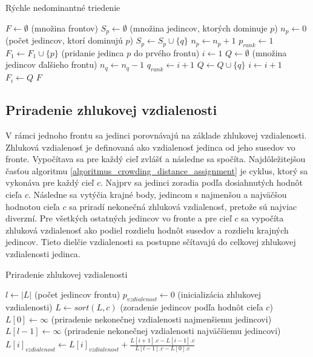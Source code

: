 \vspace*{\dimexpr 0.5\baselineskip\relax}
\begin{algorithm}[h]
\caption{Rýchle nedominantné triedenie}
\label{algoritmus_non_dominated_sorting}
  $F \gets \emptyset$ (množina frontov)\;
   {
    $S_p \gets \emptyset$ (množina jedincov, ktorých dominuje $p$)\;
    $n_p \gets 0$ (počet jedincov, ktorí dominujú $p$)\;
     {
       {
        $S_p \gets S_p \cup \{q\}$\;
      }
       {
        $n_p \gets n_p + 1$\;
      }
    }
     {
      $p_{rank} \gets 1$\;
      $F_1 \gets F_1 \cup \{p\}$ (pridanie jedinca $p$ do prvého frontu)\;
    }
  }
  $i \gets 1$\;
   {
    $Q \gets \emptyset$ (množina jedincov ďalšieho frontu)\;
     {
       {
        $n_q \gets n_q - 1$\;
         {
          $q_{rank} \gets i + 1$\;
          $Q \gets Q \cup \{q\}$\;
        }
      }
    }
    $i \gets i + 1$\;
    $F_i \gets Q$\;
  }
  \Return $F$\;
\end{algorithm}

\subsection*{Priradenie zhlukovej vzdialenosti}
V rámci jednoho frontu sa jedinci porovnávajú na základe zhlukovej vzdialenosti.
Zhluková vzdialenosť je definovaná ako vzdialenosť jedinca od jeho susedov vo fronte.
Vypočítava sa pre každý cieľ zvlášť a následne sa spočíta.
Najdôležitejšou časťou algoritmu \ref{algoritmus_crowding_distance_assignment} je cyklus, ktorý sa vykonáva pre každý cieľ $c$.
Najprv sa jedinci zoradia podľa dosiahnutých hodnôt cieľa $c$.
Následne sa vytýčia krajné body, jedincom s najmenšou a najväčšou hodnotou cieľa $c$ sa priradí nekonečná zhluková vzdialenosť, pretože sú najviac diverzní.
Pre všetkých ostatných jedincov vo fronte a pre cieľ $c$ sa vypočíta zhluková vzdialenosť ako podiel rozdielu hodnôt susedov a rozdielu krajných jedincov.
Tieto dielčie vzdialenosti sa postupne sčítavajú do celkovej zhlukovej vzdialenosti jedinca.

\vspace*{\dimexpr 0.5\baselineskip\relax}
\begin{algorithm}[h]
\caption{Priradenie zhlukovej vzdialenosti}
\label{algoritmus_crowding_distance_assignment}
  $l \gets |L|$ (počet jedincov frontu)\;
   {
    $p_{vzdialenost} \gets 0$ (inicializácia zhlukovej vzdialenosti)\;
  }
   {
    $L \gets sort(L, c)$ (zoradenie jedincov podľa hodnôt cieľa $c$)\;
    $L[0] \gets \infty$ (priradenie nekonečnej vzdialenosti najmenšiemu jedincovi)\;
    $L[l-1] \gets \infty$ (priradenie nekonečnej vzdialenosti najväčšiemu jedincovi)\;
     {
      $L[i]_{vzdialenost} \gets L[i]_{vzdialenost} + \frac{L[i+1].c - L[i-1].c}{L[l-1].c - L[0].c}$\;
    }
  }
\end{algorithm}

